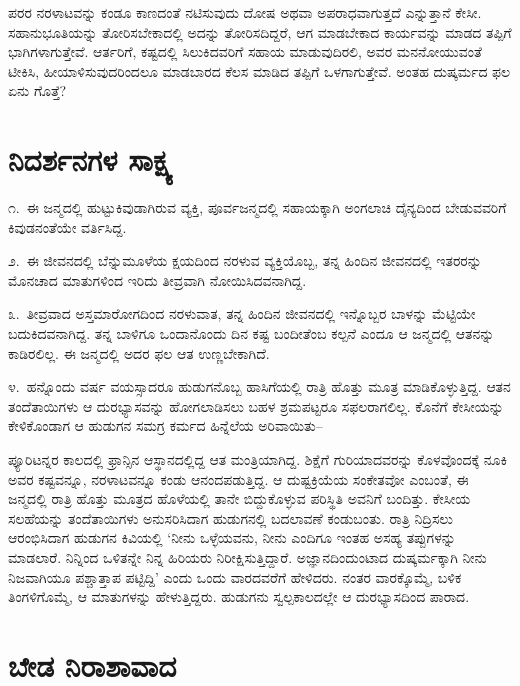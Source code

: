 
ಪರರ ನರಳಾಟವನ್ನು ಕಂಡೂ ಕಾಣದಂತೆ ನಟಿಸುವುದು ದೋಷ ಅಥವಾ ಅಪರಾಧವಾಗುತ್ತದೆ ಎನ್ನುತ್ತಾನೆ ಕೇಸೀ. ಸಹಾನುಭೂತಿಯನ್ನು ತೋರಿಸಬೇಕಾದಲ್ಲಿ ಅದನ್ನು ತೋರಿಸದಿದ್ದರೆ, ಆಗ ಮಾಡಬೇಕಾದ ಕಾರ್ಯವನ್ನು ಮಾಡದ ತಪ್ಪಿಗೆ  ಭಾಗಿಗಳಾಗುತ್ತೇವೆ. ಆರ್ತರಿಗೆ, ಕಷ್ಟದಲ್ಲಿ ಸಿಲುಕಿದವರಿಗೆ ಸಹಾಯ ಮಾಡುವುದಿರಲಿ, ಅವರ ಮನನೋಯುವಂತೆ ಟೀಕಿಸಿ, ಹೀಯಾಳಿಸುವುದರಿಂದಲೂ ಮಾಡಬಾರದ ಕೆಲಸ ಮಾಡಿದ ತಪ್ಪಿಗೆ  ಒಳಗಾಗುತ್ತೇವೆ. ಅಂತಹ ದುಷ್ಕರ್ಮದ ಫಲ ಏನು ಗೊತ್ತೆ?


\section*{ನಿದರ್ಶನಗಳ ಸಾಕ್ಷ್ಯ}


೧.\ ಈ ಜನ್ಮದಲ್ಲಿ ಹುಟ್ಟುಕಿವುಡಾಗಿರುವ ವ್ಯಕ್ತಿ, ಪೂರ್ವಜನ್ಮದಲ್ಲಿ ಸಹಾಯಕ್ಕಾಗಿ ಅಂಗಲಾಚಿ ದೈನ್ಯದಿಂದ ಬೇಡುವವರಿಗೆ ಕಿವುಡನಂತೆಯೇ ವರ್ತಿಸಿದ್ದ.

೨.\ ಈ ಜೀವನದಲ್ಲಿ ಬೆನ್ನುಮೂಳೆಯ ಕ್ಷಯದಿಂದ ನರಳುವ ವ್ಯಕ್ತಿಯೊಬ್ಬ, ತನ್ನ ಹಿಂದಿನ ಜೀವನದಲ್ಲಿ ಇತರರನ್ನು ಮೊನಚಾದ ಮಾತುಗಳಿಂದ ಇರಿದು ತೀವ್ರವಾಗಿ ನೋಯಿಸಿದವನಾಗಿದ್ದ.

೩.\ ತೀವ್ರವಾದ ಅಸ್ತಮಾರೋಗದಿಂದ ನರಳುವಾತ, ತನ್ನ ಹಿಂದಿನ ಜೀವನದಲ್ಲಿ ಇನ್ನೊಬ್ಬರ ಬಾಳನ್ನು ಮೆಟ್ಟಿಯೇ ಬದುಕಿದವನಾಗಿದ್ದ. ತನ್ನ ಬಾಳಿಗೂ ಒಂದಾನೊಂದು ದಿನ ಕಷ್ಟ ಬಂದೀತೆಂಬ ಕಲ್ಪನೆ ಎಂದೂ ಆ ಜನ್ಮದಲ್ಲಿ ಆತನನ್ನು ಕಾಡಿರಲಿಲ್ಲ. ಈ ಜನ್ಮದಲ್ಲಿ ಅದರ ಫಲ ಆತ ಉಣ್ಣಬೇಕಾಗಿದೆ.

೪.\ ಹನ್ನೊಂದು ವರ್ಷ ವಯಸ್ಸಾದರೂ ಹುಡುಗನೊಬ್ಬ ಹಾಸಿಗೆಯಲ್ಲಿ ರಾತ್ರಿ ಹೊತ್ತು ಮೂತ್ರ ಮಾಡಿಕೊಳ್ಳುತ್ತಿದ್ದ. ಆತನ ತಂದೆತಾಯಿಗಳು ಆ ದುರಭ್ಯಾಸವನ್ನು ಹೋಗಲಾಡಿಸಲು ಬಹಳ ಶ್ರಮಪಟ್ಟರೂ ಸಫಲರಾಗಲಿಲ್ಲ. ಕೊನೆಗೆ ಕೇಸೀಯನ್ನು ಕೇಳಿಕೊಂಡಾಗ ಆ ಹುಡುಗನ ಸಮಗ್ರ ಕರ್ಮದ ಹಿನ್ನೆಲೆಯ ಅರಿವಾಯಿತು–

ಪ್ಯೂರಿಟನ್ನರ ಕಾಲದಲ್ಲಿ ಫ್ರಾನ್ಸಿನ ಆಸ್ಥಾನದಲ್ಲಿದ್ದ ಆತ ಮಂತ್ರಿಯಾಗಿದ್ದ. ಶಿಕ್ಷೆಗೆ ಗುರಿ\-ಯಾದ\-ವರನ್ನು ಕೊಳವೊಂದಕ್ಕೆ ನೂಕಿ ಅವರ ಕಷ್ಟವನ್ನೂ, ನರಳಾಟವನ್ನೂ ಕಂಡು ಆನಂದಪಡುತ್ತಿದ್ದ. ಆ ದುಷ್ಟಕ್ರಿಯೆಯ ಸಂಕೇತವೋ ಎಂಬಂತೆ, ಈ ಜನ್ಮದಲ್ಲಿ ರಾತ್ರಿ ಹೊತ್ತು ಮೂತ್ರದ ಹೊಳೆಯಲ್ಲಿ ತಾನೇ ಬಿದ್ದುಕೊಳ್ಳುವ ಪರಿಸ್ಥಿತಿ ಅವನಿಗೆ ಬಂದಿತ್ತು. ಕೇಸೀಯ ಸಲಹೆಯನ್ನು ತಂದೆತಾಯಿಗಳು ಅನುಸರಿಸಿದಾಗ ಹುಡುಗನಲ್ಲಿ ಬದಲಾವಣೆ ಕಂಡುಬಂತು. ರಾತ್ರಿ ನಿದ್ರಿಸಲು ಆರಂಭಿಸಿದಾಗ ಹುಡುಗನ ಕಿವಿಯಲ್ಲಿ ‘ನೀನು ಒಳ್ಳೆಯವನು, ನೀನು ಎಂದಿಗೂ ಇಂತಹ ಅಸಹ್ಯ ತಪ್ಪುಗಳನ್ನು ಮಾಡಲಾರೆ. ನಿನ್ನಿಂದ ಒಳಿತನ್ನೇ ನಿನ್ನ ಹಿರಿಯರು ನಿರೀಕ್ಷಿಸುತ್ತಿದ್ದಾರೆ. ಅಜ್ಞಾನದಿಂದುಂಟಾದ ದುಷ್ಕರ್ಮಕ್ಕಾಗಿ ನೀನು ನಿಜವಾಗಿಯೂ ಪಶ್ಚಾತ್ತಾಪ ಪಟ್ಟಿದ್ದಿ’ ಎಂದು ಒಂದು ವಾರದವರೆಗೆ ಹೇಳಿದರು. ನಂತರ ವಾರಕ್ಕೊಮ್ಮೆ, ಬಳಿಕ ತಿಂಗಳಿಗೊಮ್ಮೆ, ಆ ಮಾತುಗಳನ್ನು ಹೇಳುತ್ತಿದ್ದರು. ಹುಡುಗನು ಸ್ವಲ್ಪಕಾಲದಲ್ಲೇ ಆ ದುರಭ್ಯಾಸದಿಂದ ಪಾರಾದ.


\section*{ಬೇಡ ನಿರಾಶಾವಾದ}

